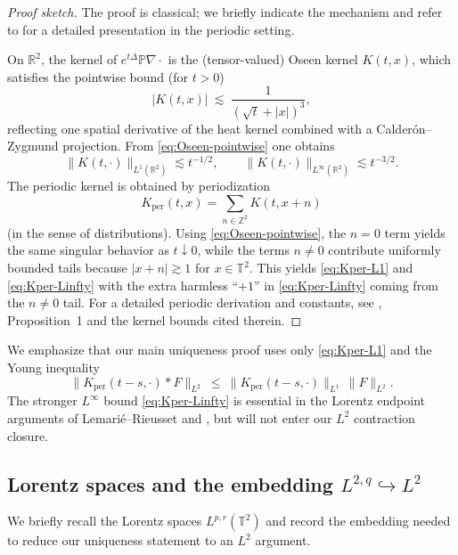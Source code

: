 \documentclass[12pt]{article}
\newcommand{\R}{\mathbb{R}}
\newcommand{\T}{\mathbb{T}}
\newcommand{\Z}{\mathbb{Z}}
\theoremstyle{remark}
\theoremstyle{remark}
\begin{document}
\begin{proof}[Proof sketch]
The proof is classical; we briefly indicate the mechanism and refer to \cite{LemarieRieusset2025HighlySingular} for a detailed
presentation in the periodic setting.

On $\R^2$, the kernel of $e^{t\Delta}\mathbb P\nabla\cdot$ is the (tensor-valued) Oseen kernel
$K(t,x)$, which satisfies the pointwise bound (for $t>0$)
\begin{equation}\label{eq:Oseen-pointwise}
|K(t,x)|\ \lesssim\ \frac{1}{(\sqrt{t}+|x|)^{3}},
\end{equation}
reflecting one spatial derivative of the heat kernel combined with a Calder\'on--Zygmund projection.
From \eqref{eq:Oseen-pointwise} one obtains
\[
\|K(t,\cdot)\|_{L^1(\R^2)}\lesssim t^{-1/2},
\qquad
\|K(t,\cdot)\|_{L^\infty(\R^2)}\lesssim t^{-3/2}.
\]
The periodic kernel is obtained by periodization
\[K_{\mathrm{per}}(t,x)=\sum_{n\in\Z^2}K(t,x+n)\] (in the sense of distributions).
Using \eqref{eq:Oseen-pointwise}, the $n=0$ term yields the same singular behavior as $t\downarrow 0$,
while the terms $n\neq 0$ contribute uniformly bounded tails because $|x+n|\gtrsim 1$ for $x\in\T^2$.
This yields \eqref{eq:Kper-L1} and \eqref{eq:Kper-Linfty} with the extra harmless ``$+1$'' in
\eqref{eq:Kper-Linfty} coming from the $n\neq 0$ tail. For a detailed periodic derivation and constants,
see \cite{LemarieRieusset2025HighlySingular}, Proposition~1 and the kernel bounds cited therein.
\end{proof}

\medskip

We emphasize that our main uniqueness proof uses only \eqref{eq:Kper-L1} and the Young inequality
\begin{equation}\label{eq:Young-L1-L2}
\|K_{\mathrm{per}}(t-s,\cdot)*F\|_{L^2}\ \le\ \|K_{\mathrm{per}}(t-s,\cdot)\|_{L^1}\,\|F\|_{L^2}.
\end{equation}
The stronger $L^\infty$ bound \eqref{eq:Kper-Linfty} is essential in the Lorentz endpoint arguments
of Lemari\'e--Rieusset and \cite{LemarieRieusset2025HighlySingular}, but will not enter our $L^2$ contraction closure.

\subsection{Lorentz spaces and the embedding $L^{2,q}\hookrightarrow L^2$}\label{subsec:lorentz}

We briefly recall the Lorentz spaces $L^{p,r}(\T^2)$ and record the embedding needed to reduce our
uniqueness statement to an $L^2$ argument.
\end{document}
